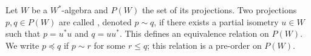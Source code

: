 Let $W$ be a $W^*$-algebra and $P(W)$ the set of its projections. Two projections $p, q \in P(W)$ are called , denoted $p \sim q$, if there exists a partial isometry $u \in W$ such that $p = u^*u$ and $q = uu^*$. This defines an equivalence relation on $P(W)$. We write $p \preceq q$ if $p \sim r$ for some $r \leq q$; this relation is a pre-order on $P(W)$.
